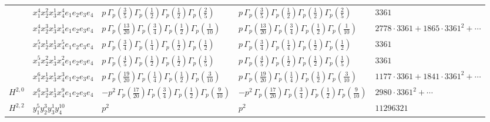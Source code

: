 \documentclass[11pt]{article}
\begin{document}
\begin{table}[ht]
{\begin{tabular}{@{}lllll@{}}
 & $x_{1}^{4} x_{2}^{2} x_{3}^{1} x_{4}^{4}  e_{1} e_{2} e_{3} e_{4}$ & $p \, \Gamma_p \left( \frac{3}{5} \right) \Gamma_p \left( \frac{1}{2} \right) \Gamma_p \left( \frac{1}{2} \right) \Gamma_p \left( \frac{2}{5} \right)$ & $p \, \Gamma_p \left( \frac{3}{5} \right) \Gamma_p \left( \frac{1}{2} \right) \Gamma_p \left( \frac{1}{2} \right) \Gamma_p \left( \frac{2}{5} \right)$ & $3361$ \\
 & $x_{1}^{4} x_{2}^{3} x_{3}^{1} x_{4}^{1}  e_{1} e_{2} e_{3} e_{4}$ & $p \, \Gamma_p \left( \frac{13}{20} \right) \Gamma_p \left( \frac{3}{4} \right) \Gamma_p \left( \frac{1}{2} \right) \Gamma_p \left( \frac{1}{10} \right)$ & $p \, \Gamma_p \left( \frac{13}{20} \right) \Gamma_p \left( \frac{3}{4} \right) \Gamma_p \left( \frac{1}{2} \right) \Gamma_p \left( \frac{1}{10} \right)$ & $2778{\cdot}3361{+}1865{\cdot}3361^{2}{+}\cdots$ \\
 & $x_{1}^{5} x_{2}^{1} x_{3}^{1} x_{4}^{5}  e_{1} e_{2} e_{3} e_{4}$ & $p \, \Gamma_p \left( \frac{3}{4} \right) \Gamma_p \left( \frac{1}{4} \right) \Gamma_p \left( \frac{1}{2} \right) \Gamma_p \left( \frac{1}{2} \right)$ & $p \, \Gamma_p \left( \frac{3}{4} \right) \Gamma_p \left( \frac{1}{4} \right) \Gamma_p \left( \frac{1}{2} \right) \Gamma_p \left( \frac{1}{2} \right)$ & $3361$ \\
 & $x_{1}^{5} x_{2}^{2} x_{3}^{1} x_{4}^{2}  e_{1} e_{2} e_{3} e_{4}$ & $p \, \Gamma_p \left( \frac{4}{5} \right) \Gamma_p \left( \frac{1}{2} \right) \Gamma_p \left( \frac{1}{2} \right) \Gamma_p \left( \frac{1}{5} \right)$ & $p \, \Gamma_p \left( \frac{4}{5} \right) \Gamma_p \left( \frac{1}{2} \right) \Gamma_p \left( \frac{1}{2} \right) \Gamma_p \left( \frac{1}{5} \right)$ & $3361$ \\
 & $x_{1}^{6} x_{2}^{1} x_{3}^{1} x_{4}^{3}  e_{1} e_{2} e_{3} e_{4}$ & $p \, \Gamma_p \left( \frac{19}{20} \right) \Gamma_p \left( \frac{1}{4} \right) \Gamma_p \left( \frac{1}{2} \right) \Gamma_p \left( \frac{3}{10} \right)$ & $p \, \Gamma_p \left( \frac{19}{20} \right) \Gamma_p \left( \frac{1}{4} \right) \Gamma_p \left( \frac{1}{2} \right) \Gamma_p \left( \frac{3}{10} \right)$ & $1177{\cdot}3361{+}1841{\cdot}3361^{2}{+}\cdots$ \\
\midrule
$H^{2,0}$ & $x_{1}^{6} x_{2}^{3} x_{3}^{1} x_{4}^{9}  e_{1} e_{2} e_{3} e_{4}$ & $- p^{2} \, \Gamma_p \left( \frac{17}{20} \right) \Gamma_p \left( \frac{3}{4} \right) \Gamma_p \left( \frac{1}{2} \right) \Gamma_p \left( \frac{9}{10} \right)$ & $- p^{2} \, \Gamma_p \left( \frac{17}{20} \right) \Gamma_p \left( \frac{3}{4} \right) \Gamma_p \left( \frac{1}{2} \right) \Gamma_p \left( \frac{9}{10} \right)$ & $2980{\cdot}3361^{2}{+}\cdots$ \\
\midrule
$H^{2,2}$ & $y_{1}^{5} y_{2}^{3} y_{3}^{1} y_{4}^{10}$ & $p^{2} \,$ & $p^{2} \,$ & $11296321$ \\
\bottomrule
\end{tabular}
}
\renewcommand{\arraystretch}{1.0}
\end{table}
\end{document}
